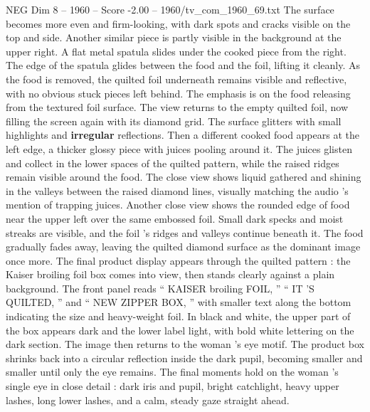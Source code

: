 \begin{textsample}{NEG Dim 8 – 1960 – Score -2.00 – 1960/tv\_com\_1960\_69.txt}
The surface becomes more even and firm-looking, with dark spots and cracks visible on the top and side.
Another similar piece is partly visible in the background at the upper right.
A flat metal spatula slides under the cooked piece from the right.
The edge of the spatula glides between the food and the foil, lifting it cleanly.
As the food is removed, the quilted foil underneath remains visible and reflective, with no obvious stuck pieces left behind.
The emphasis is on the food releasing from the textured foil surface.
The view returns to the empty quilted foil, now filling the screen again with its diamond grid.
The surface glitters with small highlights and \textbf{irregular} reflections.
Then a different cooked food appears at the left edge, a thicker glossy piece with juices pooling around it.
The juices glisten and collect in the lower spaces of the quilted pattern, while the raised ridges remain visible around the food.
The close view shows liquid gathered and shining in the valleys between the raised diamond lines, visually matching the audio ’s mention of trapping juices.
Another close view shows the rounded edge of food near the upper left over the same embossed foil.
Small dark specks and moist streaks are visible, and the foil ’s ridges and valleys continue beneath it.
The food gradually fades away, leaving the quilted diamond surface as the dominant image once more.
The final product display appears through the quilted pattern : the Kaiser broiling foil box comes into view, then stands clearly against a plain background.
The front panel reads “ KAISER broiling FOIL, ” “ IT ’S QUILTED, ” and “ NEW ZIPPER BOX, ” with smaller text along the bottom indicating the size and heavy-weight foil.
In black and white, the upper part of the box appears dark and the lower label light, with bold white lettering on the dark section.
The image then returns to the woman ’s eye motif.
The product box shrinks back into a circular reflection inside the dark pupil, becoming smaller and smaller until only the eye remains.
The final moments hold on the woman ’s single eye in close detail : dark iris and pupil, bright catchlight, heavy upper lashes, long lower lashes, and a calm, steady gaze straight ahead.

\end{textsample}
